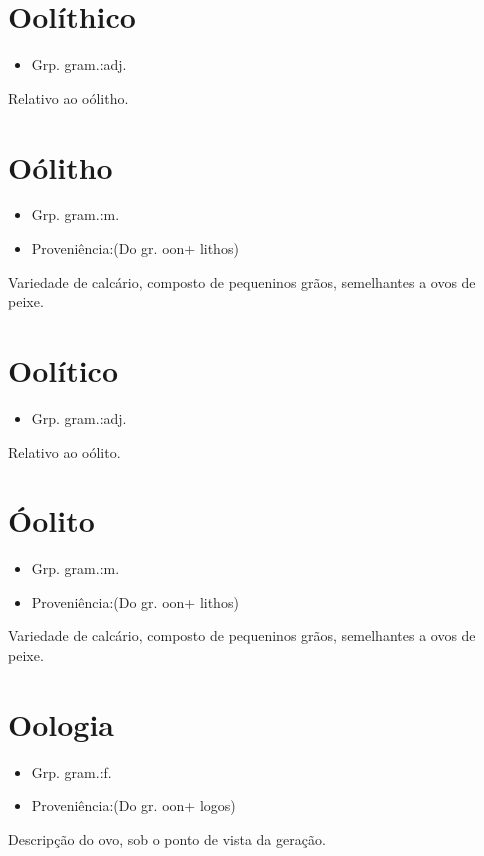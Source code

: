 \section{Oolíthico}
\begin{itemize}
\item {Grp. gram.:adj.}
\end{itemize}
Relativo ao oólitho.
\section{Oólitho}
\begin{itemize}
\item {Grp. gram.:m.}
\end{itemize}
\begin{itemize}
\item {Proveniência:(Do gr. \textunderscore oon\textunderscore  + \textunderscore lithos\textunderscore )}
\end{itemize}
Variedade de calcário, composto de pequeninos grãos, semelhantes a ovos de peixe.
\section{Oolítico}
\begin{itemize}
\item {Grp. gram.:adj.}
\end{itemize}
Relativo ao oólito.
\section{Óolito}
\begin{itemize}
\item {Grp. gram.:m.}
\end{itemize}
\begin{itemize}
\item {Proveniência:(Do gr. \textunderscore oon\textunderscore  + \textunderscore lithos\textunderscore )}
\end{itemize}
Variedade de calcário, composto de pequeninos grãos, semelhantes a ovos de peixe.
\section{Oologia}
\begin{itemize}
\item {Grp. gram.:f.}
\end{itemize}
\begin{itemize}
\item {Proveniência:(Do gr. \textunderscore oon\textunderscore  + \textunderscore logos\textunderscore )}
\end{itemize}
Descripção do ovo, sob o ponto de vista da geração.
